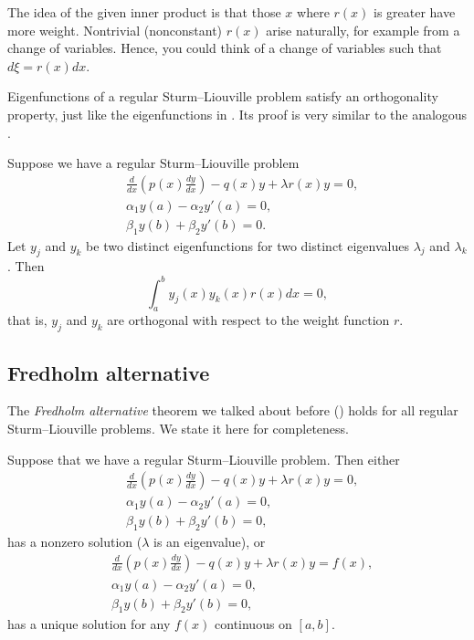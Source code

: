 \documentclass{ximera}
\begin{document}
The idea of the given inner product is that those $x$ where $r(x)$ is greater have more weight. Nontrivial (nonconstant) $r(x)$ arise naturally, for example from a change of variables. Hence, you could think of a change of variables such that $d\xi = r(x) dx$.

Eigenfunctions of a regular Sturm--Liouville problem satisfy an orthogonality property, just like the eigenfunctions in . Its proof is very similar to the analogous .

\begin{theorem}
    Suppose we have a regular Sturm--Liouville problem
    \begin{align*}
        &\frac{d}{dx} \left( p(x) \frac{dy}{dx} \right) - q(x) y + \lambda r(x) y = 0 , \\
        &\alpha_1 y(a) - \alpha_2 y'(a) = 0 , \\
        &\beta_1 y(b) + \beta_2 y'(b) = 0 .
    \end{align*}
    Let $y_j$ and $y_k$ be two distinct eigenfunctions for two distinct eigenvalues $\lambda_j$ and $\lambda_k$.  Then
    \begin{equation*}
        \int_a^b y_j(x)  y_k(x)  r(x) dx = 0,
    \end{equation*}
    that is, $y_j$ and $y_k$ are orthogonal with respect to the weight function $r$.
\end{theorem}


\subsection{Fredholm alternative}

The \emph{Fredholm alternative} theorem we talked about before () holds for all regular Sturm--Liouville problems. We state it here for completeness.

\begin{theorem}%
    Suppose that we have a regular Sturm--Liouville problem. Then either
    \begin{align*}
        &\frac{d}{dx} \left( p(x) \frac{dy}{dx} \right) - q(x) y + \lambda r(x) y = 0 , \\
        &\alpha_1 y(a) - \alpha_2 y'(a) = 0 , \\
        &\beta_1 y(b) + \beta_2 y'(b) = 0 ,
    \end{align*}
    has a nonzero solution ($\lambda$ is an eigenvalue), or
    \begin{align*}
        &\frac{d}{dx} \left( p(x) \frac{dy}{dx} \right) - q(x) y + \lambda r(x) y = f(x) , \\
        &\alpha_1 y(a) - \alpha_2 y'(a) = 0 , \\
        &\beta_1 y(b) + \beta_2 y'(b) = 0 ,
    \end{align*}
    has a unique solution for any $f(x)$ continuous on $[a,b]$.
\end{theorem}
\end{document}
